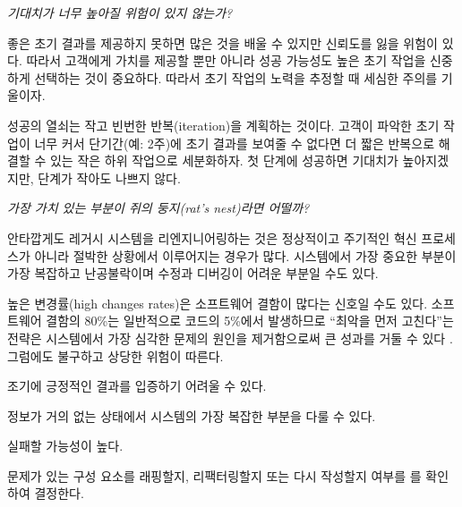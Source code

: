 \documentclass[a4paper,10pt,twoside]{book}
\begin{document}
\emph{기대치가 너무 높아질 위험이 있지 않는가?}

\begin{bulletlist}
  \item 좋은 초기 결과를 제공하지 못하면 많은 것을 배울 수 있지만 신뢰도를 잃을 위험이 있다. 따라서 고객에게 가치를 제공할 뿐만 아니라 성공 가능성도 높은 초기 작업을 신중하게 선택하는 것이 중요하다. 따라서 초기 작업의 노력을 추정할 때 세심한 주의를 기울이자.

  \item 성공의 열쇠는 작고 빈번한 반복(iteration)을 계획하는 것이다. 고객이 파악한 초기 작업이 너무 커서 단기간(예: 2주)에 초기 결과를 보여줄 수 없다면 더 짧은 반복으로 해결할 수 있는 작은 하위 작업으로 세분화하자. 첫 단계에 성공하면 기대치가 높아지겠지만, 단계가 작아도 나쁘지 않다.
\end{bulletlist}

\emph{가장 가치 있는 부분이 쥐의 둥지(rat's nest)라면 어떨까?}

\begin{bulletlist}
  \item 안타깝게도 레거시 시스템을 리엔지니어링하는 것은 정상적이고 주기적인 혁신 프로세스가 아니라 절박한 상황에서 이루어지는 경우가 많다. 시스템에서 가장 중요한 부분이 가장 복잡하고 난공불락이며 수정과 디버깅이 어려운 부분일 수도 있다. 

  \item 높은 변경률(high changes rates)은 소프트웨어 결함이 많다는 신호일 수도 있다. 소프트웨어 결함의 80\%는 일반적으로 코드의 5\%에서 발생하므로 ``최악을 먼저 고친다''는 전략은 시스템에서 가장 심각한 문제의 원인을 제거함으로써 큰 성과를 거둘 수 있다 \cite{Davi95a}. 그럼에도 불구하고 상당한 위험이 따른다.

	\begin{bulletlist}
    \item 	조기에 긍정적인 결과를 입증하기 어려울 수 있다.
  
    \item 	정보가 거의 없는 상태에서 시스템의 가장 복잡한 부분을 다룰 수 있다.

    \item 	실패할 가능성이 높다.
	\end{bulletlist}

  \item 문제가 있는 구성 요소를 래핑할지, 리팩터링할지 또는 다시 작성할지 여부를 를 확인하여 결정한다.

\end{bulletlist}
\end{document}
